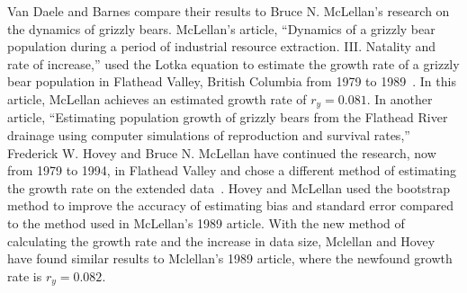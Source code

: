 
Van Daele and Barnes compare their results to Bruce N. McLellan's research on the dynamics of grizzly bears.
McLellan's article, ``Dynamics of a grizzly bear population during a period of industrial resource extraction. III. Natality and rate of increase,'' used the Lotka equation to estimate the growth rate of a grizzly bear population in Flathead Valley, British Columbia from 1979 to 1989~\cite{mclellan1989}.
In this article, McLellan achieves an estimated growth rate of $r_y=0.081$.
In another article, ``Estimating population growth of grizzly bears from the Flathead River drainage using computer simulations of reproduction and survival rates,'' Frederick W. Hovey and Bruce N. McLellan have continued the research, now from 1979 to 1994, in Flathead Valley and chose a different method of estimating the growth rate on the extended data~\cite{mclellan1996}.
Hovey and McLellan used the bootstrap method to improve the accuracy of estimating bias and standard error compared to the method used in McLellan's 1989 article.
With the new method of calculating the growth rate and the increase in data size, Mclellan and Hovey have found similar results to Mclellan's 1989 article, where the newfound growth rate is $r_y=0.082$.

